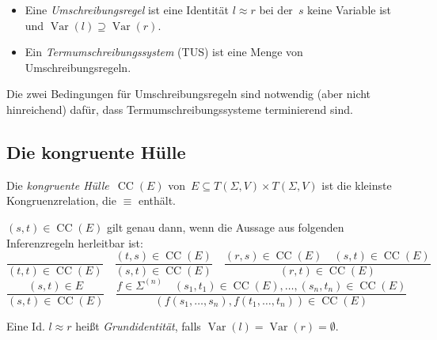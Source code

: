 \documentclass{cheat-sheet}
\DeclareMathOperator{\Var}{Var} %
\newcommand{\ident}{\approx} %
\DeclareMathOperator{\CongClos}{CC} %
\newcommand{\inferrule}[2]{\frac{{#1}}{{#2}}} %
\begin{document}

\begin{defn}
  \begin{itemize}
    \item Eine \emph{Umschreibungsregel} ist eine Identität $l \ident r$ bei der~$s$ keine Variable ist und $\Var(l) \supseteq \Var(r)$.
    \item Ein \emph{Termumschreibungssystem} (TUS) ist eine Menge von Umschreibungsregeln.
  \end{itemize}
\end{defn}

\begin{samepage}

\begin{bem}
  Die zwei Bedingungen für Umschreibungsregeln sind notwendig (aber nicht hinreichend) dafür, dass Termumschreibungssysteme terminierend sind.
\end{bem}

\subsection{Die kongruente Hülle}
  
\end{samepage}

\begin{defn}
  Die \emph{kongruente Hülle}~$\CongClos(E)$ von~$E \subseteq T(\Sigma, V) \times T(\Sigma, V)$ ist die kleinste Kongruenzrelation, die $\equiv$ enthält.
\end{defn}

\begin{bem}
  $(s, t) \in \CongClos(E)$ gilt genau dann, wenn die Aussage aus folgenden Inferenzregeln herleitbar ist:
  \[
    \inferrule
      {\,}
      {(t, t) \in \CongClos(E)} \quad
    \inferrule
      {(t, s) \in \CongClos(E)}
      {(s, t) \in \CongClos(E)} \quad
    \inferrule
      {(r, s) \in \CongClos(E) \quad
       (s, t) \in \CongClos(E)}
      {(r, t) \in \CongClos(E)}
  \]
  \[
    \inferrule
      {(s, t) \in E}
      {(s, t) \in \CongClos(E)} \quad
    \inferrule
      {f \in \Sigma^{(n)} \quad
       (s_1, t_1) \in \CongClos(E), \ldots, (s_n, t_n) \in \CongClos(E)}
      {(f(s_1, \ldots, s_n), f(t_1, \ldots, t_n)) \in \CongClos(E)}
  \]
\end{bem}

\begin{defn}
  Eine Id. $l \ident r$ heißt \emph{Grundidentität}, falls $\Var(l) \!=\! \Var(r) \!=\! \emptyset$.
\end{defn}
\end{document}
